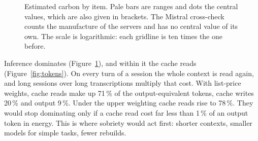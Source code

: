 \documentclass[11pt,a4paper]{article}
\newcommand{\rangerow}[5]{%
  \draw[rangefill, line width=7pt] (axis cs:#2,#1) -- (axis cs:#3,#1);
  \if\relax\detokenize{#4}\relax\else\fill[markblue] (axis cs:#4,#1) circle (2.6pt);\fi
  \node[anchor=west, font=\footnotesize, inner sep=3pt] at (axis cs:#3,#1) {#5};}
\begin{document}
\begin{figure}[h]\centering
{}
\caption{Estimated carbon by item. Pale bars are ranges and dots the central values, which are also given in brackets. The Mistral cross-check counts the manufacture of the servers and has no central value of its own. The scale is logarithmic: each gridline is ten times the one before.}\label{fig:items}
\end{figure}

Inference dominates (Figure~\ref{fig:items}), and within it the cache reads (Figure~\ref{fig:tokens}). On every turn of a session the whole context is read again, and long sessions over long transcriptions multiply that cost. With list-price weights, cache reads make up 71\,\% of the output-equivalent tokens, cache writes 20\,\% and output 9\,\%. Under the upper weighting cache reads rise to 78\,\%. They would stop dominating only if a cache read cost far less than 1\,\% of an output token in energy. This is where sobriety would act first: shorter contexts, smaller models for simple tasks, fewer rebuilds.
\end{document}
